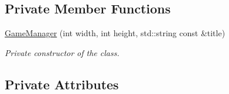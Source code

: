 \subsection*{Private Member Functions}
\begin{DoxyCompactItemize}
\item 
\hyperlink{class_game_manager_ad7179b31cffea9c6f7d2ea02ce4f7f86}{Game\-Manager} (int width, int height, std\-::string const \&title)
\begin{DoxyCompactList}\small\item\em Private constructor of the class. \end{DoxyCompactList}\end{DoxyCompactItemize}
\subsection*{Private Attributes}
